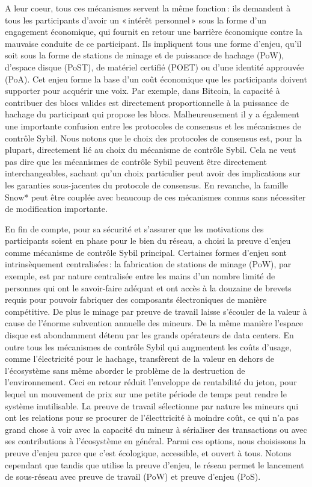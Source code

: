 \documentclass[runningheads,francais,a4paper]{llncs}
\begin{document}
A leur coeur, tous ces mécanismes servent la même fonction\,: ils demandent à tous les participants d'avoir un «\,intérêt
personnel\,»  sous la forme d'un engagement économique, qui fournit en retour une barrière économique contre la mauvaise
conduite de ce participant. Ils impliquent tous une forme d'enjeu, qu'il soit sous la forme de stations de minage et de
puissance de hachage (PoW), d'espace disque (PoST), de matériel certifié (POET) ou d'une identité approuvée (PoA). Cet
enjeu forme la base d'un coût économique que les participants doivent supporter pour acquérir une voix. Par exemple,
dans Bitcoin, la capacité à contribuer des blocs valides est directement proportionnelle à la puissance de hachage du
participant qui propose les blocs. Malheureusement il y a également une importante confusion entre les protocoles de
consensus et les mécanismes de contrôle Sybil. Nous notons que le choix des protocoles de consensus est, pour la
plupart, directement lié au choix du mécanisme de contrôle Sybil. Cela ne veut pas dire que les mécanismes de contrôle
Sybil peuvent être directement interchangeables, sachant qu'un choix particulier peut avoir des implications sur les
garanties sous-jacentes du protocole de consensus. En revanche, la famille Snow* peut être couplée avec beaucoup de ces
mécanismes connus sans nécessiter de modification importante.

En fin de compte, pour sa sécurité et s'assurer que les motivations des participants soient en phase pour le bien du
réseau, \AVATokenName{} a choisi la preuve d'enjeu comme mécanisme de contrôle Sybil principal. Certaines formes
d'enjeu sont intrinsèquement centralisées\,: la fabrication de stations de minage (PoW), par exemple, est par nature
centralisée entre les mains d'un nombre limité de personnes qui ont le savoir-faire adéquat et ont accès à la douzaine
de brevets requis pour pouvoir fabriquer des composants électroniques de manière compétitive. De plus le minage par
preuve de travail laisse s'écouler de la valeur à cause de l'énorme subvention annuelle des mineurs. De la même manière
l'espace disque est abondamment détenu par les grands opérateurs de data centers. En outre tous les mécanismes de
contrôle Sybil qui augmentent les coûts d'usage, comme l'électricité pour le hachage, transfèrent de la valeur en dehors
de l'écosystème sans même aborder le problème de la destruction de l'environnement. Ceci en retour réduit l'enveloppe de
rentabilité du jeton, pour lequel un mouvement de prix sur une petite période de temps peut rendre le système
inutilisable. La preuve de travail sélectionne par nature les mineurs qui ont les relations pour se procurer de
l'électtricité à moindre coût, ce qui n'a pas grand chose à voir avec la capacité du mineur à sérialiser des
transactions ou avec ses contributions à l'écosystème en général. Parmi ces options, nous choisissons la preuve d'enjeu
parce que c'est écologique, accessible, et ouvert à tous. Notons cependant que tandis que \AVATokenName{} utilise la
preuve d'enjeu, le réseau \AVAPlatformName{} permet le lancement de sous-réseau avec preuve de travail (PoW) et preuve
d'enjeu (PoS).
\end{document}
